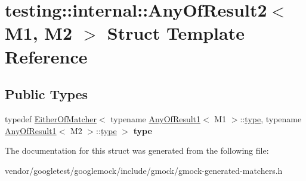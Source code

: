 \hypertarget{structtesting_1_1internal_1_1_any_of_result2}{}\section{testing\+:\+:internal\+:\+:Any\+Of\+Result2$<$ M1, M2 $>$ Struct Template Reference}
\label{structtesting_1_1internal_1_1_any_of_result2}
\subsection*{Public Types}
\begin{DoxyCompactItemize}
\item 
\mbox{\label{structtesting_1_1internal_1_1_any_of_result2_a6d9eba508021f8e652c7c154a649073f}} 
typedef \mbox{\hyperlink{classtesting_1_1internal_1_1_either_of_matcher}{Either\+Of\+Matcher}}$<$ typename \mbox{\hyperlink{structtesting_1_1internal_1_1_any_of_result1}{Any\+Of\+Result1}}$<$ M1 $>$\+::\mbox{\hyperlink{classtesting_1_1internal_1_1_either_of_matcher}{type}}, typename \mbox{\hyperlink{structtesting_1_1internal_1_1_any_of_result1}{Any\+Of\+Result1}}$<$ M2 $>$\+::\mbox{\hyperlink{classtesting_1_1internal_1_1_either_of_matcher}{type}} $>$ {\bfseries type}
\end{DoxyCompactItemize}


The documentation for this struct was generated from the following file\+:\begin{DoxyCompactItemize}
\item 
vendor/googletest/googlemock/include/gmock/gmock-\/generated-\/matchers.\+h\end{DoxyCompactItemize}
